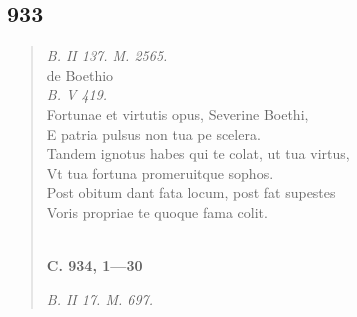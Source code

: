 \documentclass[11pt, a4paper]{report}
\begin{document}
            \subsection*{933}
      \begin{verse}
      \textit{B. II 137. M. 2565.} \\ de Boethio \\ \textit{B. V 419.} \\ Fortunae et virtutis opus, Severine Boethi, \\ E patria pulsus non tua pe scelera. \\ Tandem ignotus habes qui te colat, ut tua virtus, \\ Vt tua fortuna promeruitque sophos. \\ Post obitum dant fata locum, post fat supestes \\ Voris propriae te quoque fama colit. \\ 
        ﻿\pagebreak 
    \begin{center} \textbf{C. 934, 1—30} \end{center} \marginpar{[358]} \textit{B. II 17. M. 697.} \\ 
      \end{verse}
  
\end{document}
